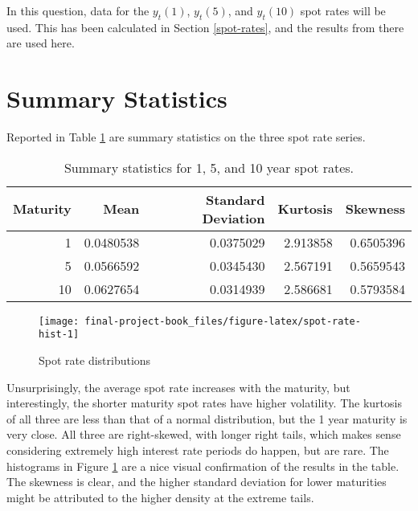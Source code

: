 \documentclass[openany]{book}
\theoremstyle{definition}
\theoremstyle{definition}
\theoremstyle{definition}
\theoremstyle{remark}
\begin{document}
\small

\normalsize

In this question, data for the \(y_t(1)\), \(y_t(5)\), and \(y_t(10)\)
spot rates will be used. This has been calculated in Section
\ref{spot-rates}, and the results from there are used here.

\small

\normalsize

\hypertarget{summary-statistics}{%
\section{Summary Statistics}\label{summary-statistics}}

Reported in Table \ref{tab:spot-rate-summary} are summary statistics on
the three spot rate series.

\small

\begin{table}[H]

\caption{\label{tab:spot-rate-summary}Summary statistics for 1, 5, and 10 year spot rates.}
\centering
\begin{tabular}[t]{rrrrr}
\toprule
Maturity & Mean & Standard Deviation & Kurtosis & Skewness\\
\midrule
1 & 0.0480538 & 0.0375029 & 2.913858 & 0.6505396\\
5 & 0.0566592 & 0.0345430 & 2.567191 & 0.5659543\\
10 & 0.0627654 & 0.0314939 & 2.586681 & 0.5793584\\
\bottomrule
\end{tabular}
\end{table}

\normalsize

\small

\begin{figure}[H]

{\centering \texttt{[image: final-project-book\_files/figure-latex/spot-rate-hist-1]} 

}

\caption{Spot rate distributions}\label{fig:spot-rate-hist}
\end{figure}

\normalsize

Unsurprisingly, the average spot rate increases with the maturity, but
interestingly, the shorter maturity spot rates have higher volatility.
The kurtosis of all three are less than that of a normal distribution,
but the 1 year maturity is very close. All three are right-skewed, with
longer right tails, which makes sense considering extremely high
interest rate periods do happen, but are rare. The histograms in Figure
\ref{fig:spot-rate-hist} are a nice visual confirmation of the results
in the table. The skewness is clear, and the higher standard deviation
for lower maturities might be attributed to the higher density at the
extreme tails.
\end{document}

